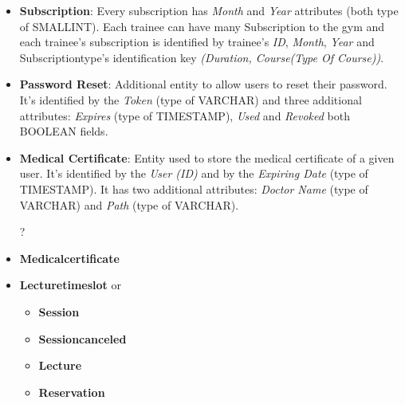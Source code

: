 \begin{itemize}
    	\item \textbf{Subscription}: Every subscription has \textit{Month} and \textit{Year} attributes (both type of SMALLINT). Each trainee can have many Subscription to the gym and each trainee's subscription is identified by trainee's \textit{ID}, \textit{Month}, \textit{Year} and Subscription\textunderscore type's identification key \textit{(Duration, Course(Type Of Course))}.
    	
    	\item \textbf{Password Reset}: Additional entity to allow users to reset their password. It's identified by the \textit{Token} (type of VARCHAR) and three additional attributes: \textit{Expires} (type of TIMESTAMP), \textit{Used} and \textit{Revoked} both BOOLEAN fields.
        
        \item \textbf{Medical Certificate}: Entity used to store the medical certificate of a given user. It's identified by the \textit{User (ID)} and by the \textit{Expiring Date} (type of TIMESTAMP). It has two additional attributes: \textit{Doctor Name} (type of VARCHAR) and \textit{Path} (type of VARCHAR).
        	
    	\color{red}
    	\item[?]
    	\item \textbf{Medical\textunderscore certificate}
    	
    	\item \textbf{Lecture\textunderscore time\textunderscore slot} or
		\begin{itemize}
    	    \item \textbf{Session}
		    \item \textbf{Session\textunderscore canceled}
		    \item \textbf{Lecture}
		    \item \textbf{Reservation}
    	\end{itemize}
		\color{black}
	
    \end{itemize}